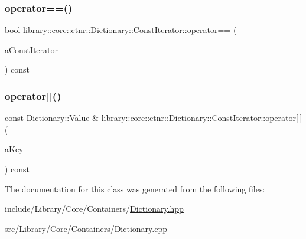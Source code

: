 \mbox{\label{classlibrary_1_1core_1_1ctnr_1_1_dictionary_1_1_const_iterator_a83feb60687b0d6b1e05afd2c92d1534f}} 
\subsubsection{\texorpdfstring{operator==()}{operator==()}}
{\footnotesize\ttfamily bool library\+::core\+::ctnr\+::\+Dictionary\+::\+Const\+Iterator\+::operator== (\begin{DoxyParamCaption}\item[{const \hyperlink{classlibrary_1_1core_1_1ctnr_1_1_dictionary_1_1_const_iterator}{Const\+Iterator} \&}]{a\+Const\+Iterator }\end{DoxyParamCaption}) const}

\mbox{\label{classlibrary_1_1core_1_1ctnr_1_1_dictionary_1_1_const_iterator_acb217265236b572c9a94a707ae8d4976}} 
\subsubsection{\texorpdfstring{operator[]()}{operator[]()}}
{\footnotesize\ttfamily const \hyperlink{classlibrary_1_1core_1_1ctnr_1_1_dictionary_a3baf6692694e4fc27cb399ac083c88ea}{Dictionary\+::\+Value} \& library\+::core\+::ctnr\+::\+Dictionary\+::\+Const\+Iterator\+::operator\mbox{[}$\,$\mbox{]} (\begin{DoxyParamCaption}\item[{const \hyperlink{classlibrary_1_1core_1_1ctnr_1_1_dictionary_a987cae687cce70d81a2a483c5e05e842}{Dictionary\+::\+Key} \&}]{a\+Key }\end{DoxyParamCaption}) const}



The documentation for this class was generated from the following files\+:\begin{DoxyCompactItemize}
\item 
include/\+Library/\+Core/\+Containers/\hyperlink{_dictionary_8hpp}{Dictionary.\+hpp}\item 
src/\+Library/\+Core/\+Containers/\hyperlink{_dictionary_8cpp}{Dictionary.\+cpp}\end{DoxyCompactItemize}
